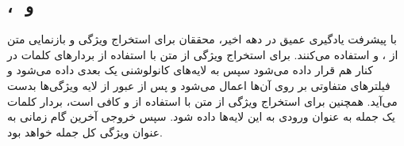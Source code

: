 \subsection{‌، ‌‌ و }
	با پیشرفت یادگیری عمیق در دهه اخیر، محققان برای استخراج ویژگی و بازنمایی متن از
	،
	\cite{hochreiter1997long}
	و
	\cite{cho2014learning}
	استفاده می‌کنند. برای استخراج ویژگی از متن با استفاده از 
	بردارهای کلمات در کنار هم قرار داده می‌شود سپس به لایه‌های کانولوشنی یک بعدی داده می‌شود و فیلتر‌های متفاوتی بر روی آن‌ها اعمال می‌شود و پس از عبور از لایه‌ 
	ویژگی‌ها بدست می‌آید. همچنین برای استخراج ویژگی از متن با استفاده از 
	و
	کافی است، بردار کلمات یک جمله به عنوان ورودی به این لایه‌ها داده شود. سپس خروجی آخرین گام زمانی به عنوان ویژگی کل جمله خواهد بود. 
